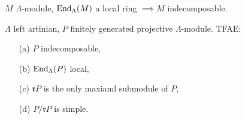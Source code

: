 
\begin{cor}
\label{cor:local_imply_indec}
$M$ $\Lambda$-module, $\operatorname{End}_\Lambda(M)$ a local ring $\implies M$ indecomposable.
\end{cor}

\begin{prop}
\label{prop:local_iff_proj-indec}
$\Lambda$ left artinian, $P$ finitely generated projective $\Lambda$-module. TFAE:
\begin{enumerate}
\item[(a)] $P$ indecomposable, 
\item[(b)] $\operatorname{End}_\Lambda(P)$ local, 
\item[(c)] $\mathfrak{r}P$ is the only maxiaml submodule of $P$, 
\item[(d)] $P/ \mathfrak{r}P$ is simple.
\end{enumerate}
\end{prop}

